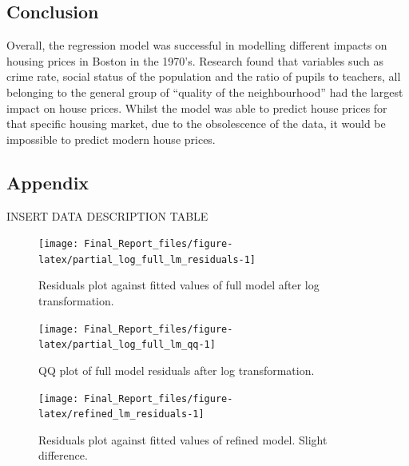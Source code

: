 \documentclass[letterpaper,10pt,twocolumn,twoside,]{pinp}
\begin{document}
\hypertarget{conclusion}{%
\subsection{Conclusion}\label{conclusion}}

Overall, the regression model was successful in modelling different
impacts on housing prices in Boston in the 1970's. Research found that
variables such as crime rate, social status of the population and the
ratio of pupils to teachers, all belonging to the general group of
``quality of the neighbourhood'' had the largest impact on house prices.
Whilst the model was able to predict house prices for that specific
housing market, due to the obsolescence of the data, it would be
impossible to predict modern house prices.

\hypertarget{appendix}{%
\subsection{Appendix}\label{appendix}}

INSERT DATA DESCRIPTION TABLE

\begin{figure}[!H]

{\centering \texttt{[image: Final\_Report\_files/figure-latex/partial\_log\_full\_lm\_residuals-1]} 

}

\caption{\label{fig:partial_log_full_lm_residuals}Residuals plot against fitted values of full model after log transformation.}\label{fig:partial_log_full_lm_residuals}
\end{figure}

\begin{figure}

{\centering \texttt{[image: Final\_Report\_files/figure-latex/partial\_log\_full\_lm\_qq-1]} 

}

\caption{\label{fig:partial_log_full_lm_qq}QQ plot of full model residuals after log transformation.}\label{fig:partial_log_full_lm_qq}
\end{figure}

\begin{figure}

{\centering \texttt{[image: Final\_Report\_files/figure-latex/refined\_lm\_residuals-1]} 

}

\caption{\label{fig:refined_lm_residuals}Residuals plot against fitted values of refined model. Slight difference.}\label{fig:refined_lm_residuals}
\end{figure}
\end{document}

